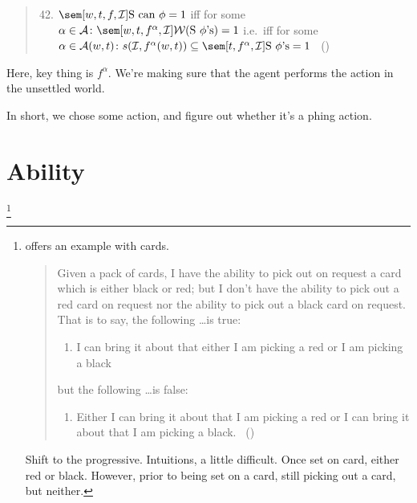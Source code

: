 \begin{note}
  \begin{quote}
    \begin{enumerate}
      \setcounter{enumi}{41}
    \item
      \(\sem[w,t,f,\mathcal{I}]{\text{S can }\phi} = 1\) iff for some \(\alpha \in \mathcal{A}\colon \sem[w,t,f^{\alpha},\mathcal{I}]{\mathcal{W}(\text{S }\phi\text{'s})} = 1\)\newline
      i.e.\ iff for some \(\alpha \in \mathcal{A}(w,t)\colon s(\mathcal{I}, f^{\alpha}(w,t)) \subseteq \sem[t,f^{\alpha},\mathcal{I}]{\text{S }\phi\text{'s}} = 1\)\newline
      \mbox{ }\hfill\mbox{(\citeyear[16]{Boylan:2020aa})}
    \end{enumerate}
  \end{quote}
  Here, key thing is \(f^{\alpha}\).
  We're making sure that the agent performs the action in the unsettled world.

  In short, we chose some action, and figure out whether it's a phing action.
\end{note}

\section{Ability}
\label{sec:ability}

\footnote{
    \citeauthor{Kenny:1976vh} offers an example with cards.

    \begin{quote}
      Given a pack of cards, I have the ability to pick out on request a card which is either black or red; but I don't have the ability to pick out a red card on request nor the ability to pick out a black card on request.
      That is to say, the following \dots is true:

      \begin{enumerate}[label=]
      \item
        I can bring it about that either I am picking a red or I am picking a black
      \end{enumerate}

      but the following \dots is false:

      \begin{enumerate}[label=]
      \item
        Either I can bring it about that I am picking a red or I can bring it about that I am picking a black.%
        \mbox{ }\hfill\mbox{(\citeyear[215]{Kenny:1976vh})}
      \end{enumerate}
    \end{quote}

    Shift to the progressive.
    Intuitions, a little difficult.
    Once set on card, either red or black.
    However, prior to being set on a card, still picking out a card, but neither.
  }

